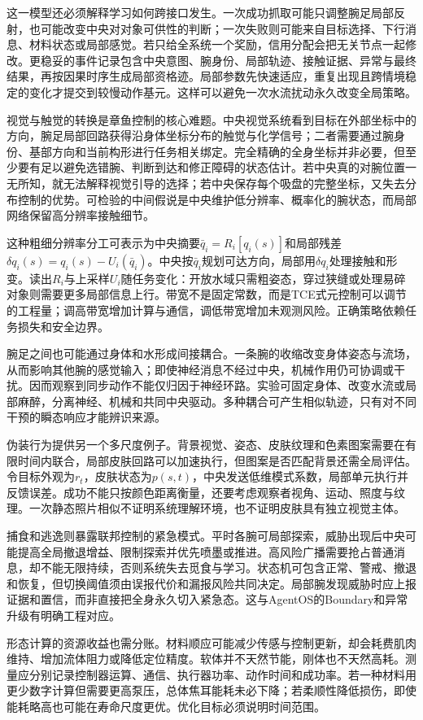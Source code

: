 这一模型还必须解释学习如何跨接口发生。一次成功抓取可能只调整腕足局部反射，也可能改变中央对对象可供性的判断；一次失败则可能来自目标选择、下行消息、材料状态或局部感觉。若只给全系统一个奖励，信用分配会把无关节点一起修改。更稳妥的事件记录包含中央意图、腕身份、局部轨迹、接触证据、异常与最终结果，再按因果时序生成局部资格迹。局部参数先快速适应，重复出现且跨情境稳定的变化才提交到较慢动作基元。这样可以避免一次水流扰动永久改变全局策略。

视觉与触觉的转换是章鱼控制的核心难题。中央视觉系统看到目标在外部坐标中的方向，腕足局部回路获得沿身体坐标分布的触觉与化学信号；二者需要通过腕身份、基部方向和当前构形进行任务相关绑定。完全精确的全身坐标并非必要，但至少要有足以避免选错腕、判断到达和修正障碍的状态估计。若中央真的对腕位置一无所知，就无法解释视觉引导的选择；若中央保存每个吸盘的完整坐标，又失去分布控制的优势。可检验的中间假说是中央维护低分辨率、概率化的腕状态，而局部网络保留高分辨率接触细节。

这种粗细分辨率分工可表示为中央摘要$\bar q_i=R_i[q_i(s)]$和局部残差$\delta q_i(s)=q_i(s)-U_i(\bar q_i)$。中央按$\bar q_i$规划可达方向，局部用$\delta q_i$处理接触和形变。读出$R_i$与上采样$U_i$随任务变化：开放水域只需粗姿态，穿过狭缝或处理易碎对象则需要更多局部信息上行。带宽不是固定常数，而是TCE式元控制可以调节的工程量；调高带宽增加计算与通信，调低带宽增加未观测风险。正确策略依赖任务损失和安全边界。

腕足之间也可能通过身体和水形成间接耦合。一条腕的收缩改变身体姿态与流场，从而影响其他腕的感觉输入；即使神经消息不经过中央，机械作用仍可协调或干扰。因而观察到同步动作不能仅归因于神经环路。实验可固定身体、改变水流或局部麻醉，分离神经、机械和共同中央驱动。多种耦合可产生相似轨迹，只有对不同干预的瞬态响应才能辨识来源。

伪装行为提供另一个多尺度例子。背景视觉、姿态、皮肤纹理和色素图案需要在有限时间内联合，局部皮肤回路可以加速执行，但图案是否匹配背景还需全局评估。令目标外观为$r_t$，皮肤状态为$p(s,t)$，中央发送低维模式系数，局部单元执行并反馈误差。成功不能只按颜色距离衡量，还要考虑观察者视角、运动、照度与纹理。一次静态照片相似不证明系统理解环境，也不证明皮肤具有独立视觉主体。

捕食和逃逸则暴露联邦控制的紧急模式。平时各腕可局部探索，威胁出现后中央可能提高全局撤退增益、限制探索并优先喷墨或推进。高风险广播需要抢占普通消息，却不能无限持续，否则系统失去觅食与学习。状态机可包含正常、警戒、撤退和恢复，但切换阈值须由误报代价和漏报风险共同决定。局部腕发现威胁时应上报证据和置信，而非直接把全身永久切入紧急态。这与AgentOS的Boundary和异常升级有明确工程对应。

形态计算的资源收益也需分账。材料顺应可能减少传感与控制更新，却会耗费肌肉维持、增加流体阻力或降低定位精度。软体并不天然节能，刚体也不天然高耗。测量应分别记录控制器运算、通信、执行器功率、动作时间和成功率。若一种材料用更少数字计算但需要更高泵压，总体焦耳能耗未必下降；若柔顺性降低损伤，即使能耗略高也可能在寿命尺度更优。优化目标必须说明时间范围。

